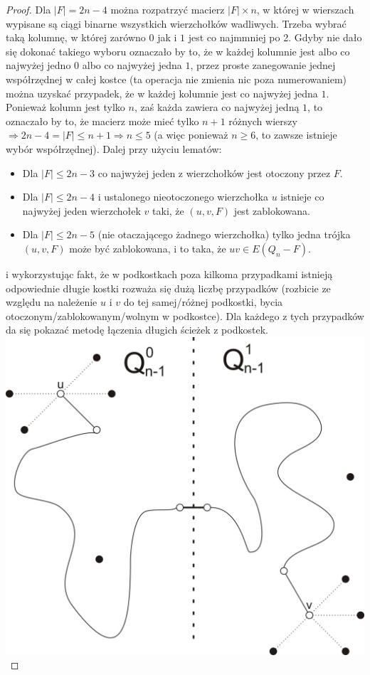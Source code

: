 \documentclass{pracamgr}
\begin{document}
\begin{proof}
    Dla $|F|=2n-4$ można rozpatrzyć macierz $|F|\times n$, w której w wierszach wypisane są ciągi binarne wszystkich wierzchołków wadliwych.
    Trzeba wybrać taką kolumnę, w której zarówno $0$ jak i $1$ jest co najmmniej po 2. Gdyby nie dało się dokonać takiego wyboru oznaczało by to, że
    w każdej kolumnie jest albo co najwyżej jedno $0$ albo co najwyżej jedna $1$, przez proste zanegowanie jednej współrzędnej w całej kostce
    (ta operacja nie zmienia nic poza numerowaniem) można uzyskać przypadek, że w każdej kolumnie jest co najwyżej jedna $1$. 
    Ponieważ kolumn jest tylko $n$, zaś każda zawiera co najwyżej jedną $1$, to oznaczało by to, że macierz może mieć tylko $n+1$ różnych wierszy
    $\Rightarrow 2n-4=|F|\le n+1\Rightarrow n\le5$ (a więc ponieważ $n\ge 6$, to zawsze istnieje wybór współrzędnej).\newline
    Dalej przy użyciu lematów:
    \begin{itemize}
     \item Dla $|F|\le 2n-3$ co najwyżej jeden z wierzchołków jest otoczony przez $F$.
     \item Dla $|F|\le 2n-4$ i ustalonego nieotoczonego wierzchołka $u$ istnieje co najwyżej jeden wierzchołek $v$ taki, że $(u,v,F)$ jest zablokowana.
     \item Dla $|F|\le 2n-5$ (nie otaczającego żadnego wierzchołka) tylko jedna trójka $(u,v,F)$ może być zablokowana, i to taka, że $uv\in E(Q_n-F)$.
    \end{itemize}
    i wykorzystując fakt, że w podkostkach poza kilkoma przypadkami istnieją odpowiednie długie kostki rozważa się dużą liczbę przypadków
    (rozbicie ze względu na należenie $u$ i $v$ do tej samej/różnej podkostki, bycia otoczonym/zablokowanym/wolnym w podkostce).
    Dla każdego z tych przypadków da się pokazać metodę łączenia długich ścieżek z podkostek.\newline
   \includegraphics[scale=0.5]{img/sciezka_laczenie1.jpg}\quad\quad\quad\quad

\end{proof}
\end{document}

